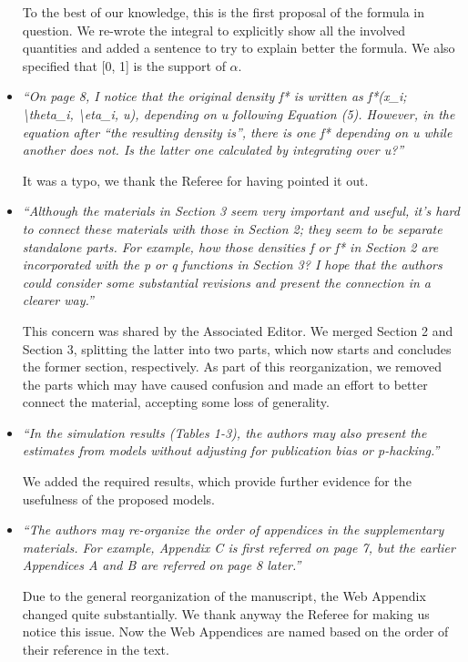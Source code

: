 \documentclass[11pt]{article}
\begin{document}
\begin{itemize}
To the best of our knowledge, this is the first proposal of the formula in question. We re-wrote the integral to explicitly show all the involved quantities and added a sentence to try to explain better the formula. We also specified that [0, 1] is the support of $\alpha$.



\item \emph{``On page 8, I notice that the original density f* is written as f*(x\_i; \textbackslash theta\_i, \textbackslash eta\_i, u), depending on u following Equation (5). However, in the equation after ``the resulting density is'', there is one f* depending on u while another does not. Is the latter one calculated by integrating over u?''}


It was a typo, we thank the Referee for having pointed it out.



\item \emph{``Although the materials in Section 3 seem very important and useful, it's hard to connect these materials with those in Section 2; they seem to be separate standalone parts. For example, how those densities f or f* in Section 2 are incorporated with the p or q functions in Section 3? I hope that the authors could consider some substantial revisions and present the connection in a clearer way.''}


This concern was shared by the Associated Editor. We merged Section 2 and Section 3, splitting the latter into two parts, which now starts and concludes the former section, respectively. As part of this reorganization, we removed the parts which may have caused confusion and made an effort to better connect the material, accepting some loss of generality.



\item \emph{``In the simulation results (Tables 1-3), the authors may also present the estimates from models without adjusting for publication bias or p-hacking.''}


We added the required results, which provide further evidence for the usefulness of the proposed models.



\item \emph{``The authors may re-organize the order of appendices in the supplementary materials. For example, Appendix C is first referred on page 7, but the earlier Appendices A and B are referred on page 8 later.''}


Due to the general reorganization of the manuscript, the Web Appendix changed quite substantially. We thank anyway the Referee for making us notice this issue. Now the Web Appendices are named based on the order of their reference in the text.


\end{itemize}
\end{document}
